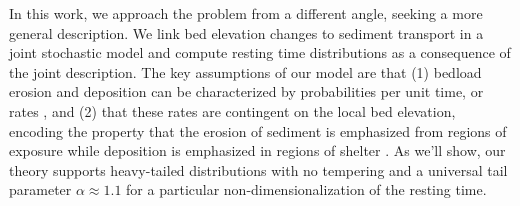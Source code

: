 \documentclass[draft]{agujournal2018}
\begin{document}
In this work, we approach the problem from a different angle, seeking a more general description.
We link bed elevation changes to sediment transport in a joint stochastic model and compute resting time distributions as a consequence of the joint description.
The key assumptions of our model are that (1) bedload erosion and deposition can be characterized by probabilities per unit time, or rates \citep[e.g.][]{Einstein1950, Ancey2008}, and (2) that these rates are contingent on the local bed elevation, encoding the property that the erosion of sediment is emphasized from regions of exposure while deposition is emphasized in regions of shelter \citep[e.g.][]{Sawai1987, Wang2007}.
As we'll show, our theory supports heavy-tailed distributions with no tempering and a universal tail parameter $\alpha \approx 1.1$ for a particular non-dimensionalization of the resting time.
\end{document}
